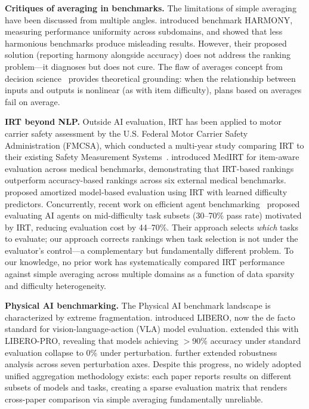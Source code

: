 \documentclass[11pt,a4paper]{article}
\begin{document}
\textbf{Critiques of averaging in benchmarks.} The limitations of simple averaging have been discussed from multiple angles. \citet{uzunoglu2025} introduced benchmark HARMONY, measuring performance uniformity across subdomains, and showed that less harmonious benchmarks produce misleading results. However, their proposed solution (reporting harmony alongside accuracy) does not address the ranking problem---it diagnoses but does not cure. The flaw of averages concept from decision science~\cite{savage2009} provides theoretical grounding: when the relationship between inputs and outputs is nonlinear (as with item difficulty), plans based on averages fail on average.

\textbf{IRT beyond NLP.} Outside AI evaluation, IRT has been applied to motor carrier safety assessment by the U.S. Federal Motor Carrier Safety Administration (FMCSA), which conducted a multi-year study comparing IRT to their existing Safety Measurement Systems~\cite{fmcsa2021}. \citet{luo2025medirt} introduced MedIRT for item-aware evaluation across medical benchmarks, demonstrating that IRT-based rankings outperform accuracy-based rankings across six external medical benchmarks. \citet{truong2025} proposed amortized model-based evaluation using IRT with learned difficulty predictors. Concurrently, recent work on efficient agent benchmarking~\cite{agentbench2026} proposed evaluating AI agents on mid-difficulty task subsets (30--70\% pass rate) motivated by IRT, reducing evaluation cost by 44--70\%. Their approach selects \emph{which} tasks to evaluate; our approach corrects rankings when task selection is not under the evaluator's control---a complementary but fundamentally different problem. To our knowledge, no prior work has systematically compared IRT performance against simple averaging across multiple domains as a function of data sparsity and difficulty heterogeneity.

\textbf{Physical AI benchmarking.} The Physical AI benchmark landscape is characterized by extreme fragmentation. \citet{liu2023libero} introduced LIBERO, now the de facto standard for vision-language-action (VLA) model evaluation. \citet{zhou2025b} extended this with LIBERO-PRO, revealing that models achieving $>$90\% accuracy under standard evaluation collapse to 0\% under perturbation. \citet{fei2025} further extended robustness analysis across seven perturbation axes. Despite this progress, no widely adopted unified aggregation methodology exists: each paper reports results on different subsets of models and tasks, creating a sparse evaluation matrix that renders cross-paper comparison via simple averaging fundamentally unreliable.
\end{document}
